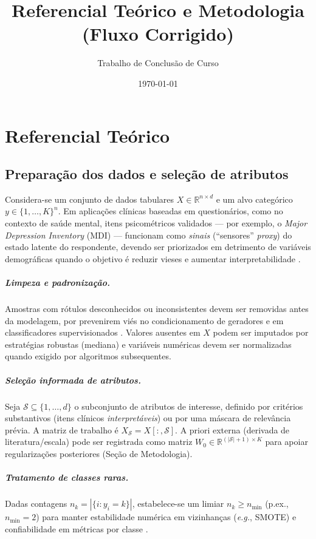 \documentclass[12pt,a4paper]{report}
\title{\textbf{Referencial Teórico e Metodologia (Fluxo Corrigido)}}
\author{Trabalho de Conclusão de Curso}
\date{\today}
\begin{document}
\maketitle


\chapter{Referencial Teórico}

\section{Preparação dos dados e seleção de atributos}

Considera-se um conjunto de dados tabulares $X\in\mathbb{R}^{n\times d}$ e um alvo categórico $y\in\{1,\dots,K\}^n$. Em aplicações clínicas baseadas em questionários, como no contexto de saúde mental, itens psicométricos validados --- por exemplo, o \emph{Major Depression Inventory} (MDI) --- funcionam como \emph{sinais} (``sensores'' \emph{proxy}) do estado latente do respondente, devendo ser priorizados em detrimento de variáveis demográficas quando o objetivo é reduzir vieses e aumentar interpretabilidade \cite{Bech2001MDI,Olsen2003MDI}.

\paragraph{Limpeza e padronização.}
Amostras com rótulos desconhecidos ou inconsistentes devem ser removidas antes da modelagem, por prevenirem viés no condicionamento de geradores e em classificadores supervisionados \cite{He2009Imbalance}. Valores ausentes em $X$ podem ser imputados por estratégias robustas (mediana) e variáveis numéricas devem ser normalizadas quando exigido por algoritmos subsequentes.

\paragraph{Seleção informada de atributos.}
Seja $\mathcal{S}\subseteq\{1,\dots,d\}$ o subconjunto de atributos de interesse, definido por critérios substantivos (itens clínicos \emph{interpretáveis}) ou por uma máscara de relevância prévia. A matriz de trabalho é $X_{\mathcal{S}}=X[:,\mathcal{S}]$. A priori externa (derivada de literatura/escala) pode ser registrada como matriz $W_0\in\mathbb{R}^{(|\mathcal{S}|+1)\times K}$ para apoiar regularizações posteriores (Seção de Metodologia).

\paragraph{Tratamento de classes raras.}
Dadas contagens $n_k=|\{i: y_i=k\}|$, estabelece-se um limiar $n_k\geq n_{\min}$ (p.ex., $n_{\min}=2$) para manter estabilidade numérica em vizinhanças (\emph{e.g.}, SMOTE) e confiabilidade em métricas por classe \cite{He2009Imbalance}.
\end{document}
